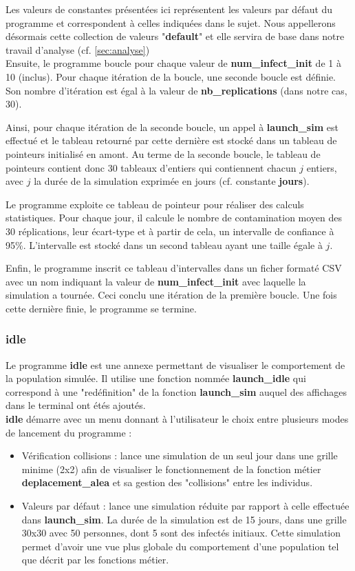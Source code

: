 \documentclass[12pt,french,titlepage]{article}
\begin{document}
Les valeurs de constantes présentées ici représentent les valeurs par défaut du programme et correspondent à celles indiquées dans le sujet. Nous appellerons désormais cette collection de valeurs "\textbf{default}" et elle servira de base dans notre travail d'analyse (cf. \ref{sec:analyse})\\

Ensuite, le programme boucle pour chaque valeur de \textbf{num\_infect\_init} de 1 à 10 (inclus). Pour chaque itération de la boucle, une seconde boucle est définie. Son nombre d'itération est égal à la valeur de \textbf{nb\_replications} (dans notre cas, 30). 

Ainsi, pour chaque itération de la seconde boucle, un appel à \textbf{launch\_sim} est effectué et le tableau retourné par cette dernière est stocké dans un tableau de pointeurs initialisé en amont. Au terme de la seconde boucle, le tableau de pointeurs contient donc 30 tableaux d'entiers qui contiennent chacun $j$ entiers, avec $j$ la durée de la simulation exprimée en jours (cf. constante \textbf{jours}).


Le programme exploite ce tableau de pointeur pour réaliser des calculs statistiques. Pour chaque jour, il calcule le nombre de contamination moyen des 30 réplications, leur écart-type et à partir de cela, un intervalle de confiance à 95\%. L'intervalle est stocké dans un second tableau ayant une taille égale à $j$.

Enfin, le programme inscrit ce tableau d'intervalles dans un ficher formaté CSV avec un nom indiquant la valeur de \textbf{num\_infect\_init} avec laquelle la simulation a tournée. Ceci conclu une itération de la première boucle. Une fois cette dernière finie, le programme se termine.

\subsubsection{idle}
Le programme \textbf{idle} est une annexe permettant de visualiser le comportement de la population simulée. Il utilise une fonction nommée \textbf{launch\_idle} qui correspond à une "redéfinition" de la fonction \textbf{launch\_sim} auquel des affichages dans le terminal ont étés ajoutés.\\

\textbf{idle} démarre avec un menu donnant à l'utilisateur le choix entre plusieurs modes de lancement du programme :
\begin{itemize}
\item Vérification collisions : lance une simulation de un seul jour dans une grille minime (2x2) afin de visualiser le fonctionnement de la fonction métier \textbf{deplacement\_alea} et sa gestion des "collisions" entre les individus.

\item Valeurs par défaut : lance une simulation réduite par rapport à celle effectuée dans \textbf{launch\_sim}. La durée de la simulation est de 15 jours, dans une grille 30x30 avec 50 personnes, dont 5 sont des infectés initiaux. Cette simulation permet d'avoir une vue plus globale du comportement d'une population tel que décrit par les fonctions métier.\\
\end{itemize}
\end{document}
